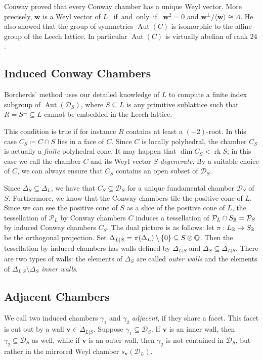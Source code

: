 \documentclass[11pt,letterpaper]{amsart}
\newcommand{\vect}[1]{\boldsymbol{#1}}
\DeclareMathOperator{\rk}{rk}
\DeclareMathOperator{\Aut}{Aut}
\begin{document}
Conway \cite[Ch.~27,~{\S}2,~Theorem~1]{conway.sloane.lattices} proved that every Conway chamber has a unique Weyl vector. More precisely, $\vect{w}$ is a Weyl vector of $L$ \mbox{ if and only if } $\vect{w}^2 = 0$ and $\vect{w}^\perp / \langle \vect{w} \rangle \cong \Lambda$. 
He also showed that the group of symmetries $\Aut(C)$ is isomorphic to the affine group of the Leech lattice. In particular $\Aut(C)$ is virtually abelian of rank $24$.

\subsection{Induced Conway Chambers}
Borcherds' method uses our detailed knowledge of $L$ to 
compute a finite index subgroup of $\Aut(\mathcal{D}_S)$, where $S \subseteq L$ is any primitive sublattice such that $R = S^\perp \subseteq L$ cannot be embedded in the Leech lattice. 

This condition is true if for instance $R$ contains at least a $(-2)$-root. 
In this case $C_S \coloneqq  C\cap S$ lies in a face of $C$.
Since $C$ is locally polyhedral, the chamber $C_S$ is actually a \emph{finite} polyhedral cone. It may happen that $\dim C_S < \rk S$; in this case we call the chamber $C$ and its Weyl vector \emph{$S$-degenerate}. By a suitable choice of $C$, we can always ensure that $C_S$ contains an open subset of $\mathcal{D}_S$. 

Since $\Delta_S \subseteq \Delta_L$, we have that $C_S \subseteq \mathcal{D}_S$ for a unique fundamental chamber $\mathcal{D}_S$ of $S$.
Furthermore, we know that the Conway chambers tile the positive cone of $L$. 
Since we can see the positive cone of $S$ as a slice of the positive cone of $L$, the tessellation of $\mathcal{P}_L$ by Conway chambers $C$ 
induces a tessellation of $\mathcal{P}_L \cap S_{\mathbb{R}} = \mathcal{P}_S$ by induced Conway chambers $C_S$. The dual picture is as follows:
let $\pi: L_{\mathbb{R}} \to S_{\mathbb{R}}$ be the orthogonal projection. 
Set $\Delta_{L|S} = \pi(\Delta_L) \setminus \{0\} \subseteq S \otimes \mathbb{Q}$. Then the tessellation by induced chambers has walls defined by $\Delta_{L|S}$ and $\Delta_S \subseteq \Delta_{L|S}$. There are two types of walls: the elements of $\Delta_S$ are called \emph{outer walls} and the elements of $\Delta_{L|S} \setminus \Delta_{S}$ \emph{inner walls}. 

\subsection{Adjacent Chambers}
We call two induced chambers $\gamma_1$ and $\gamma_2$ \emph{adjacent}, if they share a facet. This facet is cut out by a wall $\vect{v} \in \Delta_{L|S}$. Suppose $\gamma_1 \subseteq \mathcal{D}_S$.
If $\vect{v}$ is an inner wall, then $\gamma_2 \subseteq \mathcal{D}_S$ as well, while if $\vect{v}$ is an outer wall, then $\gamma_2$ is not contained in $\mathcal{D}_S$, but rather in the mirrored Weyl chamber $s_{\vect{v}}(\mathcal{D}_L)$.
\end{document}
